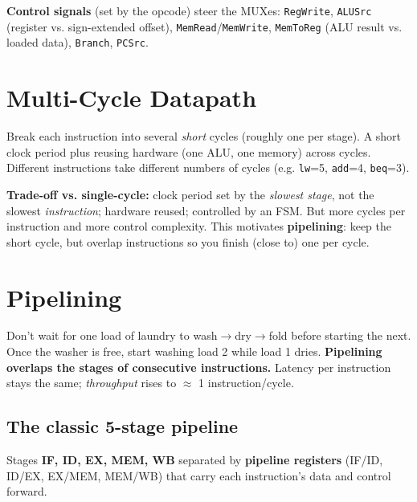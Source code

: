 \documentclass[10pt]{article}
\newcommand{\code}[1]{\texttt{\small #1}}
\begin{document}
\textbf{Control signals} (set by the opcode) steer the MUXes: \code{RegWrite}, \code{ALUSrc}
(register vs. sign-extended offset), \code{MemRead}/\code{MemWrite}, \code{MemToReg} (ALU result
vs. loaded data), \code{Branch}, \code{PCSrc}.

\section{Multi-Cycle Datapath}

\begin{keybox}[Idea]
Break each instruction into several \emph{short} cycles (roughly one per stage). A short clock
period plus reusing hardware (one ALU, one memory) across cycles. Different instructions take
different numbers of cycles (e.g. \code{lw}=5, \code{add}=4, \code{beq}=3).
\end{keybox}
\textbf{Trade-off vs. single-cycle:} clock period set by the \emph{slowest stage}, not the
slowest \emph{instruction}; hardware reused; controlled by an FSM. But more cycles per
instruction and more control complexity. This motivates \textbf{pipelining}: keep the short
cycle, but overlap instructions so you finish (close to) one per cycle.

\section{Pipelining}

\begin{keybox}
Don't wait for one load of laundry to wash$\to$dry$\to$fold before starting the next. Once the
washer is free, start washing load 2 while load 1 dries. \textbf{Pipelining overlaps the stages
of consecutive instructions.} Latency per instruction stays the same; \emph{throughput} rises to
$\approx$ 1 instruction/cycle.
\end{keybox}

\subsection{The classic 5-stage pipeline}
Stages \textbf{IF, ID, EX, MEM, WB} separated by \textbf{pipeline registers} (IF/ID, ID/EX,
EX/MEM, MEM/WB) that carry each instruction's data and control forward.
\end{document}
